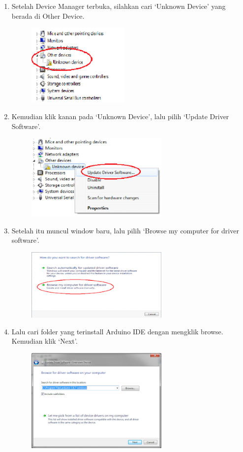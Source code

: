 \begin{enumerate}
\item Setelah Device Manager terbuka, silahkan cari `Unknown Device' yang berada di Other Device.
	\begin{figure}[H]
		\includegraphics[width=5cm]{figures/5/1154121/Teori/4.png}
		\centering
	\end{figure}
\item Kemudian klik kanan pada `Unknown Device', lalu pilih `Update Driver Software'.
	\begin{figure}[H]
		\includegraphics[width=7cm]{figures/5/1154121/Teori/5.png}
		\centering
	\end{figure}
\item Setelah itu muncul window baru, lalu pilih `Browse my computer for driver software'.
	\begin{figure}[H]
		\includegraphics[width=7cm]{figures/5/1154121/Teori/6.png}
		\centering
	\end{figure}
\item Lalu cari folder yang terinstall Arduino IDE dengan mengklik browse. Kemudian klik `Next'.
	\begin{figure}[H]
		\includegraphics[width=7cm]{figures/5/1154121/Teori/7.png}

\end{figure}
\end{enumerate}
